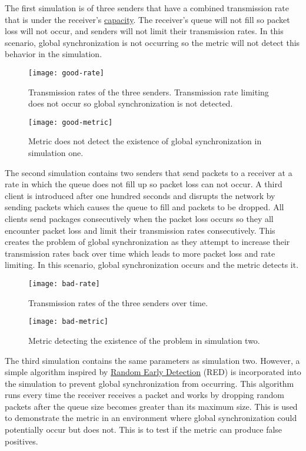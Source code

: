 \documentclass{article}
\begin{document}
The first simulation is of three senders that have a combined transmission rate that is under the receiver's \href{https://www.solarwinds.com/resources/it-glossary/network-capacity}{capacity}. The receiver's queue will not fill so packet loss will not occur, and senders will not limit their transmission rates. In this scenario, global synchronization is not occurring so the metric will not detect this behavior in the simulation.
	
\begin{figure}[H]
	\centering
	\texttt{[image: good-rate]}
	\caption{Transmission rates of the three senders. Transmission rate limiting does not occur so global synchronization is not detected.}
\end{figure}

\begin{figure}[H]
	\centering
	\texttt{[image: good-metric]}
	\caption{Metric does not detect the existence of global synchronization in simulation one.}
\end{figure}

The second simulation contains two senders that send packets to a receiver at a rate in which the queue does not fill up so packet loss can not occur. A third client is introduced after one hundred seconds and disrupts the network by sending packets which causes the queue to fill and packets to be dropped. All clients send packages consecutively when the packet loss occurs so they all encounter packet loss and limit their transmission rates consecutively. This creates the problem of global synchronization as they attempt to increase their transmission rates back over time which leads to more packet loss and rate limiting. In this scenario, global synchronization occurs and the metric detects it.

\begin{figure}[H]
	\centering
	\texttt{[image: bad-rate]}
	\caption{Transmission rates of the three senders over time.}
\end{figure}

\begin{figure}[H]
	\centering
	\texttt{[image: bad-metric]}
	\caption{Metric detecting the existence of the problem in simulation two.}
\end{figure}

The third simulation contains the same parameters as simulation two. However, a simple algorithm inspired by \href{https://en.wikipedia.org/wiki/Random_early_detection}{Random Early Detection} (RED) is incorporated into the simulation to prevent global synchronization from occurring. This algorithm runs every time the receiver receives a packet and works by dropping random packets after the queue size becomes greater than its maximum size. This is used to demonstrate the metric in an environment where global synchronization could potentially occur but does not. This is to test if the metric can produce false positives.
\end{document}
